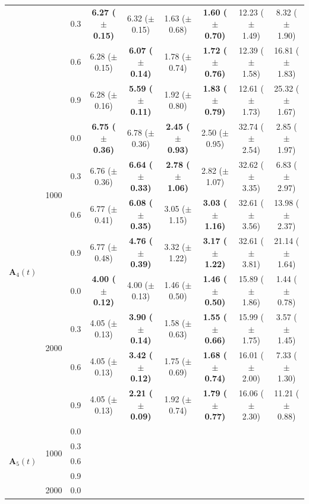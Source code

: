 \begin{table}[htbp]
{\begin{tabular}{lll|cc|cc|cc}
 &  & 0.3 & \textbf{6.27 ($\pm$ 0.15)} & 6.32 ($\pm$ 0.15) & 1.63 ($\pm$ 0.68) & \textbf{1.60 ($\pm$ 0.70)} & 12.23 ($\pm$ 1.49) & 8.32 ($\pm$ 1.90) \\
 &  & 0.6 & 6.28 ($\pm$ 0.15) & \textbf{6.07 ($\pm$ 0.14)} & 1.78 ($\pm$ 0.74) & \textbf{1.72 ($\pm$ 0.76)} & 12.39 ($\pm$ 1.58) & 16.81 ($\pm$ 1.83) \\
 &  & 0.9 & 6.28 ($\pm$ 0.16) & \textbf{5.59 ($\pm$ 0.11)} & 1.92 ($\pm$ 0.80) & \textbf{1.83 ($\pm$ 0.79)} & 12.61 ($\pm$ 1.73) & 25.32 ($\pm$ 1.67) \\
\hline
\multirow{8}{*}{$\mathbf{A}_4(t)$} & \multirow{4}{*}{1000} & 0.0 & \textbf{6.75 ($\pm$ 0.36)} & 6.78 ($\pm$ 0.36) & \textbf{2.45 ($\pm$ 0.93)} & 2.50 ($\pm$ 0.95) & 32.74 ($\pm$ 2.54) & 2.85 ($\pm$ 1.97) \\
 &  & 0.3 & 6.76 ($\pm$ 0.36) & \textbf{6.64 ($\pm$ 0.33)} & \textbf{2.78 ($\pm$ 1.06)} & 2.82 ($\pm$ 1.07) & 32.62 ($\pm$ 3.35) & 6.83 ($\pm$ 2.97) \\
 &  & 0.6 & 6.77 ($\pm$ 0.41) & \textbf{6.08 ($\pm$ 0.35)} & 3.05 ($\pm$ 1.15) & \textbf{3.03 ($\pm$ 1.16)} & 32.61 ($\pm$ 3.56) & 13.98 ($\pm$ 2.37) \\
 &  & 0.9 & 6.77 ($\pm$ 0.48) & \textbf{4.76 ($\pm$ 0.39)} & 3.32 ($\pm$ 1.22) & \textbf{3.17 ($\pm$ 1.22)} & 32.61 ($\pm$ 3.81) & 21.14 ($\pm$ 1.64) \\
\cline{2-9}
 & \multirow{4}{*}{2000} & 0.0 & \textbf{4.00 ($\pm$ 0.12)} & 4.00 ($\pm$ 0.13) & 1.46 ($\pm$ 0.50) & \textbf{1.46 ($\pm$ 0.50)} & 15.89 ($\pm$ 1.86) & 1.44 ($\pm$ 0.78) \\
 &  & 0.3 & 4.05 ($\pm$ 0.13) & \textbf{3.90 ($\pm$ 0.14)} & 1.58 ($\pm$ 0.63) & \textbf{1.55 ($\pm$ 0.66)} & 15.99 ($\pm$ 1.75) & 3.57 ($\pm$ 1.45) \\
 &  & 0.6 & 4.05 ($\pm$ 0.13) & \textbf{3.42 ($\pm$ 0.12)} & 1.75 ($\pm$ 0.69) & \textbf{1.68 ($\pm$ 0.74)} & 16.01 ($\pm$ 2.00) & 7.33 ($\pm$ 1.30) \\
 &  & 0.9 & 4.05 ($\pm$ 0.13) & \textbf{2.21 ($\pm$ 0.09)} & 1.92 ($\pm$ 0.74) & \textbf{1.79 ($\pm$ 0.77)} & 16.06 ($\pm$ 2.30) & 11.21 ($\pm$ 0.88) \\
\hline
\multirow{8}{*}{$\mathbf{A}_5(t)$} & \multirow{4}{*}{1000} & 0.0 &  &  &  &  &  &  \\
 &  & 0.3 &  &  &  &  &  &  \\
 &  & 0.6 &  &  &  &  &  &  \\
 &  & 0.9 &  &  &  &  &  &  \\
\cline{2-9}
 & \multirow{4}{*}{2000} & 0.0 &  &  &  &  &  &  \\

\end{tabular}}
\end{table}
